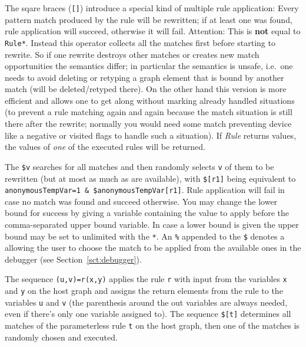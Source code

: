 The sqare braces (\texttt{[]}) introduce a special kind of multiple rule application:
Every pattern match produced by the rule will be rewritten;
if at least one was found, rule application will succeed, otherwise it will fail. 
Attention: This  is \textbf{not} equal to \texttt{Rule*}.
Instead this operator collects all the matches first before starting to rewrite.
So if one rewrite destroys other matches or creates new match opportunities the semantics differ;
in particular the semantics is unsafe, i.e.\ one needs to avoid deleting or retyping a graph element that is bound by another match (will be deleted/retyped there). On the other hand this version is more efficient and allows one to get along without marking already handled situations (to prevent a rule matching again and again because the match situation is still there after the rewrite; normally you would need some match preventing device like a negative or visited flags to handle such a situation).
If \emph{Rule} returns values, the values of \emph{one} of the executed rules will be returned.

The  \texttt{\$v} searches for all matches and then randomly selects \texttt{v} of them to be rewritten (but at most as much as are available), with \texttt{\$[r1]} being equivalent to \texttt{anonymousTempVar=1 \& \$anonymousTempVar[r1]}.
Rule application will fail in case no match was found and succeed otherwise. 
You may change the lower bound for success by giving a variable containing the value to apply before the comma-separated upper bound variable.
In case a lower bound is given the upper bound may be set to unlimited with the \texttt{*}.
An \texttt{\%} appended to the \texttt{\$} denotes a  
allowing the user to choose the match to be applied from the available ones in the debugger (see Section~\ref{sct:debugger}).

\begin{example}
The sequence \verb#(u,v)=r(x,y)# applies the rule \texttt{r} with input from the variables \texttt{x} and \texttt{y} on the host graph 
and assigns the return elements from the rule to the variables \texttt{u} and \texttt{v} (the parenthesis around the out variables are always needed, even if there's only one variable assigned to).
The sequence \verb#$[t]# determines all matches of the parameterless rule \texttt{t} on the host graph, then one of the matches is randomly chosen and executed.
\end{example}


